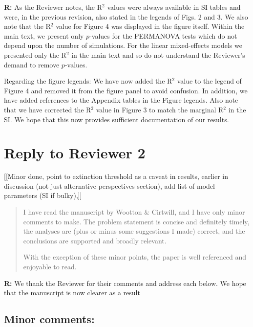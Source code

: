 \documentclass[12pt]{article}
\begin{document}
      \smallskip

      \textbf{R:} As the Reviewer notes, the R$^2$ values were always available in SI tables and were, in the previous revision, also stated in the legends of Figs. 2 and 3. We also note that the R$^2$ value for Figure 4 was displayed in the figure itself. Within the main text, we present only $p$-values for the PERMANOVA tests which do not depend upon the number of simulations. For the linear mixed-effects models we presented only the R$^2$ in the main text and so do not understand the Reviewer's demand to remove $p$-values.


      Regarding the figure legends: We have now added the R$^2$ value to the legend of Figure 4 and removed it from the figure panel to avoid confusion. In addition, we have added references to the Appendix tables in the Figure legends. Also note that we have corrected the R$^2$ value in Figure 3 to match the marginal R$^2$ in the SI. We hope that this now provides sufficient documentation of our results.



\clearpage

\section*{Reply to Reviewer 2} [[Minor done, point to extinction threshold as a caveat in results, earlier in discussion (not just alternative perspectives section), add list of model parameters (SI if bulky),]]

  \begin{quotation}
    I have read the manuscript by Wootton \& Cirtwill, and I have only minor comments to make. The problem statement is concise and definitely timely, the analyses are (plus or minus some suggestions I made) correct, and the conclusions are supported and broadly relevant.

    With the exception of these minor points, the paper is well referenced and enjoyable to read.
  \end{quotation}  

  \smallskip

  \textbf{R:} We thank the Reviewer for their comments and address each below. We hope that the manuscript is now clearer as a result

  \smallskip

  \subsection*{Minor comments:}
\end{document}
